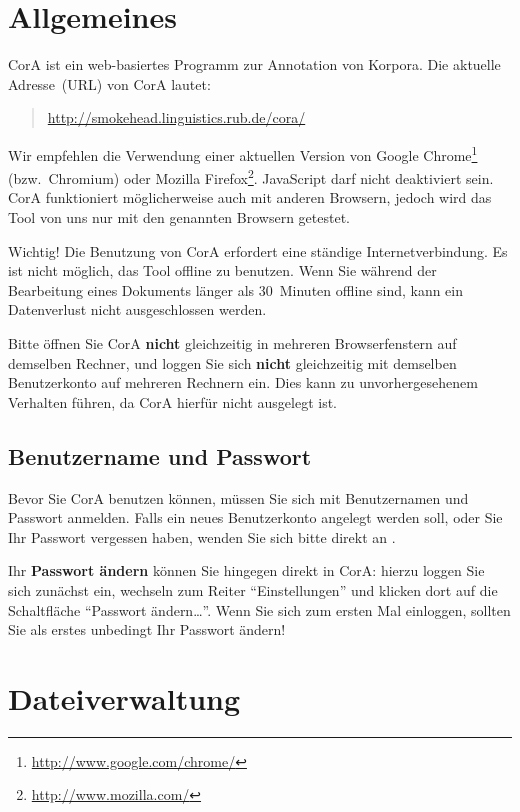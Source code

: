 \documentclass[11pt,a4paper,parskip=half]{scrartcl}
\begin{document}
\section{Allgemeines}

CorA ist ein web-basiertes Programm zur Annotation von Korpora.  Die
aktuelle Adresse~(URL) von CorA lautet:

\begin{quote}
  \url{http://smokehead.linguistics.rub.de/cora/}
\end{quote}

Wir empfehlen die Verwendung einer aktuellen Version von Google
Chrome\footnote{\url{http://www.google.com/chrome/}} (bzw.\ Chromium)
oder Mozilla Firefox\footnote{\url{http://www.mozilla.com/}}.
JavaScript darf nicht deaktiviert sein.  CorA funktioniert
möglicherweise auch mit anderen Browsern, jedoch wird das Tool von uns
nur mit den genannten Browsern getestet.

\begin{alertbox}{Wichtig!}
  Die Benutzung von CorA erfordert eine ständige Internetverbindung.
  Es ist nicht möglich, das Tool offline zu benutzen.  Wenn Sie
  während der Bearbeitung eines Dokuments länger als 30~Minuten
  offline sind, kann ein Datenverlust nicht ausgeschlossen werden.
\end{alertbox}

Bitte öffnen Sie CorA \textbf{nicht} gleichzeitig in mehreren
Browserfenstern auf demselben Rechner, und loggen Sie sich
\textbf{nicht} gleichzeitig mit demselben Benutzerkonto auf mehreren
Rechnern ein.  Dies kann zu unvorhergesehenem Verhalten führen, da
CorA hierfür nicht ausgelegt ist.

\subsection{Benutzername und Passwort}

Bevor Sie CorA benutzen können, müssen Sie sich mit Benutzernamen und
Passwort anmelden.  Falls ein neues Benutzerkonto angelegt werden
soll, oder Sie Ihr Passwort vergessen haben, wenden Sie sich bitte
direkt an \mmb{}.

Ihr \textbf{Passwort ändern} können Sie hingegen direkt in CorA:
hierzu loggen Sie sich zunächst ein, wechseln zum Reiter
"`Einstellungen"' und klicken dort auf die Schaltfläche "`Passwort
ändern\ldots"'.  Wenn Sie sich zum ersten Mal einloggen, sollten Sie
als erstes unbedingt Ihr Passwort ändern!

\newpage
\section{Dateiverwaltung}
\label{sec:datei}
\end{document}
